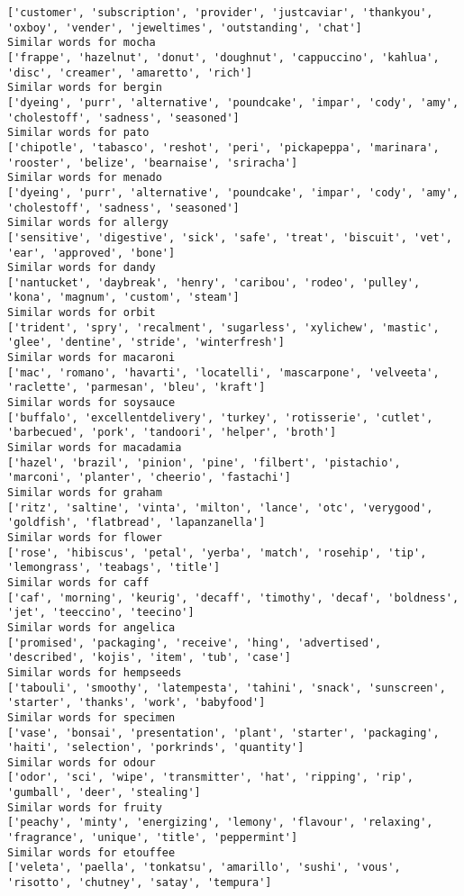 \documentclass[11pt]{article}
\begin{document}
\begin{Verbatim}[commandchars=\\\{\}]
['customer', 'subscription', 'provider', 'justcaviar', 'thankyou', 'oxboy', 'vender', 'jeweltimes', 'outstanding', 'chat']
Similar words for mocha
['frappe', 'hazelnut', 'donut', 'doughnut', 'cappuccino', 'kahlua', 'disc', 'creamer', 'amaretto', 'rich']
Similar words for bergin
['dyeing', 'purr', 'alternative', 'poundcake', 'impar', 'cody', 'amy', 'cholestoff', 'sadness', 'seasoned']
Similar words for pato
['chipotle', 'tabasco', 'reshot', 'peri', 'pickapeppa', 'marinara', 'rooster', 'belize', 'bearnaise', 'sriracha']
Similar words for menado
['dyeing', 'purr', 'alternative', 'poundcake', 'impar', 'cody', 'amy', 'cholestoff', 'sadness', 'seasoned']
Similar words for allergy
['sensitive', 'digestive', 'sick', 'safe', 'treat', 'biscuit', 'vet', 'ear', 'approved', 'bone']
Similar words for dandy
['nantucket', 'daybreak', 'henry', 'caribou', 'rodeo', 'pulley', 'kona', 'magnum', 'custom', 'steam']
Similar words for orbit
['trident', 'spry', 'recalment', 'sugarless', 'xylichew', 'mastic', 'glee', 'dentine', 'stride', 'winterfresh']
Similar words for macaroni
['mac', 'romano', 'havarti', 'locatelli', 'mascarpone', 'velveeta', 'raclette', 'parmesan', 'bleu', 'kraft']
Similar words for soysauce
['buffalo', 'excellentdelivery', 'turkey', 'rotisserie', 'cutlet', 'barbecued', 'pork', 'tandoori', 'helper', 'broth']
Similar words for macadamia
['hazel', 'brazil', 'pinion', 'pine', 'filbert', 'pistachio', 'marconi', 'planter', 'cheerio', 'fastachi']
Similar words for graham
['ritz', 'saltine', 'vinta', 'milton', 'lance', 'otc', 'verygood', 'goldfish', 'flatbread', 'lapanzanella']
Similar words for flower
['rose', 'hibiscus', 'petal', 'yerba', 'match', 'rosehip', 'tip', 'lemongrass', 'teabags', 'title']
Similar words for caff
['caf', 'morning', 'keurig', 'decaff', 'timothy', 'decaf', 'boldness', 'jet', 'teeccino', 'teecino']
Similar words for angelica
['promised', 'packaging', 'receive', 'hing', 'advertised', 'described', 'kojis', 'item', 'tub', 'case']
Similar words for hempseeds
['tabouli', 'smoothy', 'latempesta', 'tahini', 'snack', 'sunscreen', 'starter', 'thanks', 'work', 'babyfood']
Similar words for specimen
['vase', 'bonsai', 'presentation', 'plant', 'starter', 'packaging', 'haiti', 'selection', 'porkrinds', 'quantity']
Similar words for odour
['odor', 'sci', 'wipe', 'transmitter', 'hat', 'ripping', 'rip', 'gumball', 'deer', 'stealing']
Similar words for fruity
['peachy', 'minty', 'energizing', 'lemony', 'flavour', 'relaxing', 'fragrance', 'unique', 'title', 'peppermint']
Similar words for etouffee
['veleta', 'paella', 'tonkatsu', 'amarillo', 'sushi', 'vous', 'risotto', 'chutney', 'satay', 'tempura']

\end{Verbatim}
\end{document}
